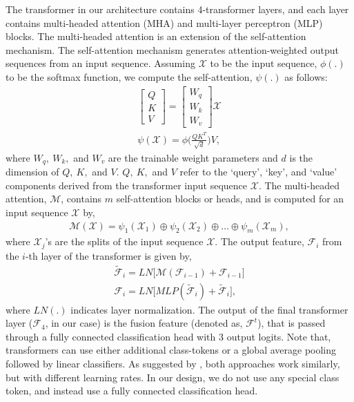 \par The transformer in our architecture contains 4-transformer layers, and each layer contains multi-headed attention (MHA) and multi-layer perceptron (MLP) blocks. The multi-headed attention is an extension of the self-attention mechanism. The self-attention mechanism generates attention-weighted output sequences from an input sequence. Assuming $\mathcal{X}$ to be the input sequence, $\phi(.)$ to be the softmax function, we compute the self-attention, $\psi(.)$ as follows:
\begin{align}
    \begin{bmatrix}
    Q \\
    K \\
    V
    \end{bmatrix} = 
    \begin{bmatrix}
    W_q \\
    W_k \\
    W_v
    \end{bmatrix} \mathcal{X} \\
    \psi(\mathcal{X}) = \phi \Big( \frac{QK^T}{\sqrt{d}} \Big) V, 
\end{align}
where $W_q,~ W_k,$ and $W_v$ are the trainable weight parameters and $d$ is the dimension of $Q,~K,$ and $V$. $Q,~K,$ and $V$ refer to the `query', `key', and `value' components derived from the transformer input sequence $\mathcal{X}$. The multi-headed attention, $\mathcal{M}$, contains $m$ self-attention blocks or heads, and is computed for an input sequence $\mathcal{X}$ by,
\begin{align}
    \mathcal{M}(\mathcal{X}) = \psi_1(\mathcal{X}_1) \oplus \psi_2(\mathcal{X}_2) \oplus \ldots \oplus \psi_m(\mathcal{X}_m),
\end{align}
where $\mathcal{X}_j$'s are the splits of the input sequence $\mathcal{X}$.
The output feature, $\mathcal{F}_i$ from the $i$-th layer of the transformer is given by,
\begin{align}
    \tilde{\mathcal{F}}_i = LN\big[\mathcal{M}(\mathcal{F}_{i-1})+\mathcal{F}_{i-1}\big] \\
    \mathcal{F}_i = LN\big[MLP(\tilde{\mathcal{F}}_i) + \tilde{\mathcal{F}}_i \big],
\end{align}
where $LN(.)$ indicates layer normalization. The output of the final transformer layer ($\mathcal{F}_4$, in our case) is the fusion feature (denoted as, $\mathcal{F}^t$), that is passed through a fully connected classification head with 3 output logits. %
Note that, transformers can use either additional class-tokens or a global average pooling followed by linear classifiers. As suggested by \cite{dosovitskiy2020image}, both approaches work similarly, but with different learning rates. In our design, we do not use any special class token, and instead use a fully connected classification head.

